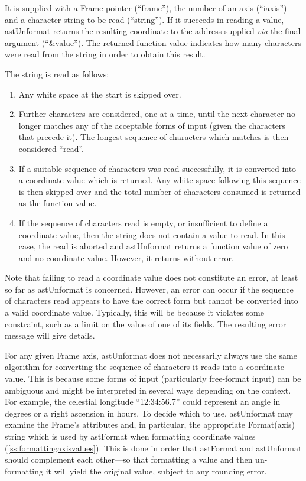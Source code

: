 \documentclass[twoside,11pt]{article}
\newcommand{\htmlref}[2]{#1}
\newcommand{\secref}[1]{\S\ref{#1}}
\renewcommand{\secref}[1]{\ref{#1}}
\begin{document}
It is supplied with a Frame pointer (``frame''), the number of an axis
(``iaxis'') and a character string to be read (``string''). If it
succeeds in reading a value, astUnformat returns the resulting
coordinate to the address supplied {\em{via}} the final argument
(``\&value''). The returned function value indicates how many
characters were read from the string in order to obtain this result.

The string is read as follows:

\begin{enumerate}
\item Any white space at the start is skipped over.

\item Further characters are considered, one at a time, until the next
character no longer matches any of the acceptable forms of input
(given the characters that precede it). The longest sequence of
characters which matches is then considered ``read''.

\item If a suitable sequence of characters was read successfully, it
is converted into a coordinate value which is returned. Any white
space following this sequence is then skipped over and the total
number of characters consumed is returned as the function value.

\item If the sequence of characters read is empty, or insufficient to
define a coordinate value, then the string does not contain a value to
read. In this case, the read is aborted and astUnformat returns a
function value of zero and no coordinate value.  However, it returns
without error.
\end{enumerate}

Note that failing to read a coordinate value does not constitute an
error, at least so far as astUnformat is concerned. However, an error
can occur if the sequence of characters read appears to have the
correct form but cannot be converted into a valid coordinate
value. Typically, this will be because it violates some constraint,
such as a limit on the value of one of its fields. The resulting error
message will give details.

For any given Frame axis, astUnformat does not necessarily always use
the same algorithm for converting the sequence of characters it reads
into a coordinate value. This is because some forms of input
(particularly free-format input) can be ambiguous and might be
interpreted in several ways depending on the context. For example, the
celestial longitude ``12:34:56.7'' could represent an angle in degrees
or a right ascension in hours. To decide which to use, astUnformat may
examine the Frame's attributes and, in particular, the appropriate
\htmlref{Format(axis)}{Formataxis} string which is used by astFormat when formatting
coordinate values (\secref{ss:formattingaxisvalues}). This is done in
order that astFormat and astUnformat should complement each other---so
that formatting a value and then un-formatting it will yield the
original value, subject to any rounding error.
\end{document}
